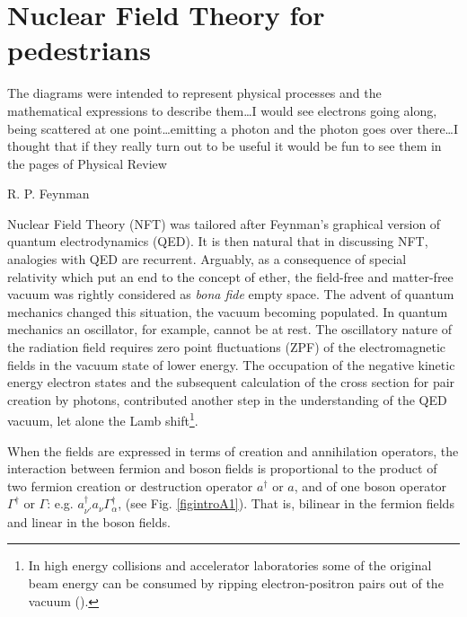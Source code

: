 \section{Nuclear Field Theory for pedestrians}\label{appintroA}
\epigraph{The diagrams were intended to represent physical processes and the mathematical expressions to describe them\dots I would see electrons going along, being scattered at one point\dots emitting a photon and the photon goes over there\dots I thought that if they really turn out to be useful it would be fun to see them in the pages of Physical Review}{R. P. Feynman}
Nuclear Field Theory (NFT) was tailored after Feynman's graphical version of quantum electrodynamics (QED). It is then natural that in discussing NFT, analogies with QED are recurrent.   Arguably, as a consequence of special relativity which put an end to the concept of ether, the field-free and matter-free vacuum was rightly considered as \textit{bona fide} empty space. The advent of quantum mechanics changed this situation, the vacuum becoming populated. In quantum mechanics an oscillator, for example, cannot be at rest. The oscillatory nature of the radiation field requires zero point fluctuations (ZPF) of the electromagnetic fields in the vacuum state of lower energy. The occupation of the negative kinetic energy electron states and the subsequent calculation of the cross section for pair creation by photons, contributed another step in the understanding of the QED vacuum, let alone the Lamb shift\footnote{In high energy collisions and accelerator laboratories some of the original beam energy can be consumed by ripping electron-positron pairs out of the vacuum (\cite{Bruce:07}).}.


When the fields are expressed in terms of creation and annihilation operators, the interaction between  fermion and boson fields is proportional to the product of two fermion creation or destruction operator $a^\dagger$ or $a$, and of one boson operator $\Gamma^\dagger$ or $\Gamma$: e.g. $a^\dagger_{\nu'}a_\nu\Gamma_\alpha^\dagger$, (see Fig. \ref{figintroA1}). That is,  bilinear in the fermion fields and linear in the boson fields.

